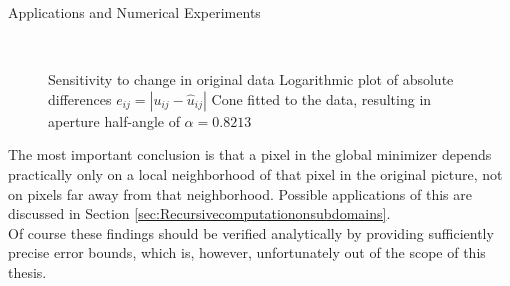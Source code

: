 \begin{chapter}{Applications and Numerical Experiments}
\begin{figure}[h!]
    \centering
    \\
    \caption[Sensitivity to variation]{Sensitivity to change in original data
	 Logarithmic plot of absolute differences $e_{ij}=|u_{ij}-\hat{u}_{ij}|$
	 Cone fitted to the data, resulting in aperture half-angle of $\alpha=0.8213$
	\label{fig:experiment_sensitivity}
    }
\end{figure}

The most important conclusion is that a pixel in the global minimizer depends practically only on a local neighborhood of that pixel
in the original picture, not on pixels far away from that neighborhood. Possible applications of this are discussed in Section \ref{sec:Recursivecomputationonsubdomains}.\\

Of course these findings should be verified analytically by providing sufficiently precise error bounds, which is, however, unfortunately out of the scope of this thesis.


\end{chapter}
